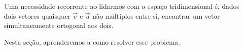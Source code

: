 Uma necessidade recorrente ao lidarmos com o espaço tridimensional é, dados dois vetores quaisquer \(\vec{v}\) e \(\vec{u}\)
não múltiplos entre si, encontrar um vetor simultaneamente ortogonal aos dois.

Nesta seção, aprenderemos a como resolver esse problema.